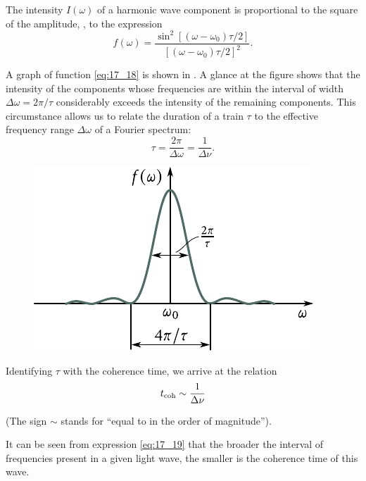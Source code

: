 The intensity $I(\omega)$ of a harmonic wave component is proportional to the square of the amplitude, \ie, to the expression
\begin{equation}\label{eq:17_18}
    f(\omega) = \frac{\sin^2[(\omega-\omega_0)\tau/2]}{[(\omega-\omega_0)\tau/2]^2}.
\end{equation}

\noindent
A graph of function \eqref{eq:17_18} is shown in .
A glance at the figure shows that the intensity of the components whose frequencies are within the interval of width $\Delta{\omega} = 2\pi/\tau$ considerably exceeds the intensity of the remaining components.
This circumstance allows us to relate the duration of a train $\tau$ to the effective frequency range $\Delta{\omega}$ of a Fourier spectrum:
\begin{equation*}
    \tau = \frac{2\pi}{\Delta{\omega}} = \frac{1}{\Delta{\nu}}.
\end{equation*}

\begin{figure}[t]
	\begin{center}
		\includegraphics[scale=1]{figures/ch_17/fig_17_5.pdf}
		\caption[]{}
		\label{fig:17_5}
	\end{center}
	\vspace{-0.9cm}
\end{figure}

Identifying $\tau$ with the coherence time, we arrive at the relation
\begin{equation}\label{eq:17_19}
    t_{\text{coh}} \sim \frac{1}{\Delta{\nu}}
\end{equation}

\noindent
(The sign $\sim$ stands for ``equal to in the order of magnitude'').

It can be seen from expression \eqref{eq:17_19} that the broader the interval of frequencies present in a given light wave, the smaller is the coherence time of this wave.

